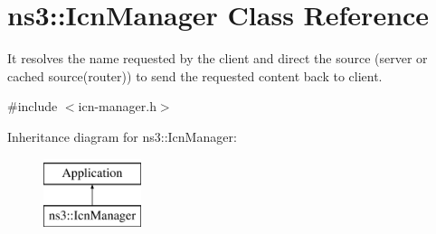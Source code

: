 \hypertarget{classns3_1_1IcnManager}{\section{ns3\-:\-:Icn\-Manager Class Reference}
\label{classns3_1_1IcnManager}
}


It resolves the name requested by the client and direct the source (server or cached source(router)) to send the requested content back to client.  




{\ttfamily \#include $<$icn-\/manager.\-h$>$}

Inheritance diagram for ns3\-:\-:Icn\-Manager\-:\begin{figure}[H]
\begin{center}
\leavevmode
\includegraphics[height=2.000000cm]{classns3_1_1IcnManager}
\end{center}
\end{figure}
